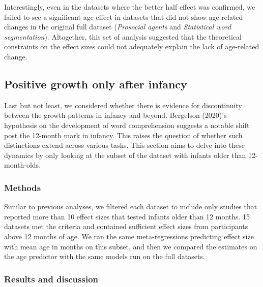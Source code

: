 \documentclass[
  man]{apa6}
\begin{document}
Interestingly, even in the datasets where the better half effect was confirmed, we failed to see a significant age effect in datasets that did not show age-related changes in the original full dataset (\emph{Prosocial agents} and \emph{Statistical word segmentation}). Altogether, this set of analysis suggested that the theoretical constraints on the effect sizes could not adequately explain the lack of age-related change.

\hypertarget{positive-growth-only-after-infancy}{%
\subsection{Positive growth only after infancy}\label{positive-growth-only-after-infancy}}

Last but not least, we considered whether there is evidence for discontinuity between the growth patterns in infancy and beyond. Bergelson (2020)'s hypothesis on the development of word comprehension suggests a notable shift post the 12-month mark in infancy. This raises the question of whether such distinctions extend across various tasks. This section aims to delve into these dynamics by only looking at the subset of the dataset with infants older than 12-month-olds.

\hypertarget{methods-4}{%
\subsubsection{Methods}\label{methods-4}}

Similar to previous analyses, we filtered each dataset to include only studies that reported more than 10 effect sizes that tested infants older than 12 months. 15 datasets met the criteria and contained sufficient effect sizes from participants above 12 months of age. We ran the same meta-regressions predicting effect size with mean age in months on this subset, and then we compared the estimates on the age predictor with the same models run on the full datasets.

\hypertarget{results-and-discussion-3}{%
\subsubsection{Results and discussion}\label{results-and-discussion-3}}
\end{document}
